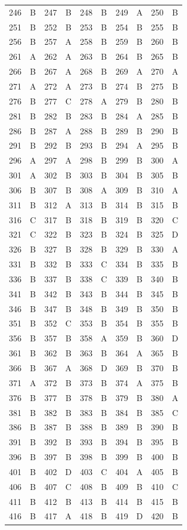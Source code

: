 \begin{longtable}{cc|cc|cc|cc|cc}
246 & B & 247 & B & 248 & B & 249 & A & 250 & B \\
251 & B & 252 & B & 253 & B & 254 & B & 255 & B \\
256 & B & 257 & A & 258 & B & 259 & B & 260 & B \\
261 & A & 262 & A & 263 & B & 264 & B & 265 & B \\
266 & B & 267 & A & 268 & B & 269 & A & 270 & A \\
271 & A & 272 & A & 273 & B & 274 & B & 275 & B \\
276 & B & 277 & C & 278 & A & 279 & B & 280 & B \\
281 & B & 282 & B & 283 & B & 284 & A & 285 & B \\
286 & B & 287 & A & 288 & B & 289 & B & 290 & B \\
291 & B & 292 & B & 293 & B & 294 & A & 295 & B \\
296 & A & 297 & A & 298 & B & 299 & B & 300 & A \\
301 & A & 302 & B & 303 & B & 304 & B & 305 & B \\
306 & B & 307 & B & 308 & A & 309 & B & 310 & A \\
311 & B & 312 & A & 313 & B & 314 & B & 315 & B \\
316 & C & 317 & B & 318 & B & 319 & B & 320 & C \\
321 & C & 322 & B & 323 & B & 324 & B & 325 & D \\
326 & B & 327 & B & 328 & B & 329 & B & 330 & A \\
331 & B & 332 & B & 333 & C & 334 & B & 335 & B \\
336 & B & 337 & B & 338 & C & 339 & B & 340 & B \\
341 & B & 342 & B & 343 & B & 344 & B & 345 & B \\
346 & B & 347 & B & 348 & B & 349 & B & 350 & B \\
351 & B & 352 & C & 353 & B & 354 & B & 355 & B \\
356 & B & 357 & B & 358 & A & 359 & B & 360 & D \\
361 & B & 362 & B & 363 & B & 364 & A & 365 & B \\
366 & B & 367 & A & 368 & D & 369 & B & 370 & B \\
371 & A & 372 & B & 373 & B & 374 & A & 375 & B \\
376 & B & 377 & B & 378 & B & 379 & B & 380 & A \\
381 & B & 382 & B & 383 & B & 384 & B & 385 & C \\
386 & B & 387 & B & 388 & B & 389 & B & 390 & B \\
391 & B & 392 & B & 393 & B & 394 & B & 395 & B \\
396 & B & 397 & B & 398 & B & 399 & B & 400 & B \\
401 & B & 402 & D & 403 & C & 404 & A & 405 & B \\
406 & B & 407 & C & 408 & B & 409 & B & 410 & C \\
411 & B & 412 & B & 413 & B & 414 & B & 415 & B \\
416 & B & 417 & A & 418 & B & 419 & D & 420 & B \\
\bottomrule
\end{longtable}

